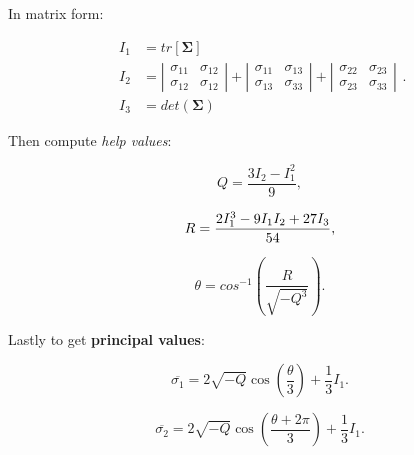 \documentclass[10pt,b5paper,titlepage]{book}
\begin{document}
\begin{itemize}
        In matrix form:

        \begin{equation}
            \begin{array}{ll}
                I_{1} &= tr[\mathbf{\Sigma}] \\
                I_{2} &= \left| \begin{matrix}
                    \sigma_{11} & \sigma_{12} \\
                    \sigma_{12} & \sigma_{12}
                \end{matrix} \right| + \left| \begin{matrix}
                    \sigma_{11} & \sigma_{13} \\
                    \sigma_{13} & \sigma_{33}
                \end{matrix} \right| + \left| \begin{matrix}
                    \sigma_{22} & \sigma_{23} \\
                    \sigma_{23} & \sigma_{33}
                \end{matrix} \right| \\
                    I_{3} &= det(\mathbf{\Sigma})
            \end{array}
        .\end{equation}

        Then compute \textit{help values}:

        \begin{equation}
            Q = \frac{3 I_{2} - I_{1}^{2}}{9}
        ,\end{equation}

        \begin{equation}
            R = \frac{2 I_{1}^{3} - 9 I_{1} I_{2} + 27 I_{3}}{54} \\
        ,\end{equation}

        \begin{equation}
            \theta = cos^{-1} \left( \frac{ R }{ \sqrt{- Q^{3}}} \right)
        .\end{equation}

        Lastly to get \textbf{principal values}:

        \begin{equation}
            \overline{\sigma_{1}}
            = 2 \sqrt{-Q} \cos{\left(\frac{\theta}{3}\right)} + \frac{1}{3}I_{1}
        .\end{equation}

        \begin{equation}
            \overline{\sigma_{2}}
            = 2 \sqrt{-Q} \cos{\left(\frac{\theta + 2 \pi}{3}\right)} + \frac{1}{3}I_{1}
        .\end{equation}


\end{itemize}
\end{document}
